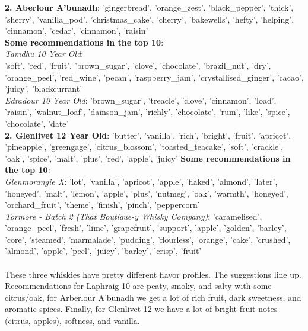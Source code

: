 \documentclass{article}
\begin{document}
\textbf{2. Aberlour A'bunadh}: 'gingerbread', 'orange\_zest', 'black\_pepper', 'thick', 'sherry', 'vanilla\_pod', 'christmas\_cake', 'cherry', 'bakewells', 'hefty', 'helping', 'cinnamon', 'cedar', 'cinnamon', 'raisin' \\
\textbf{Some recommendations in the top 10}:\\
\textit{Tamdhu 10 Year Old}:\\ 'soft', 'red', 'fruit', 'brown\_sugar', 'clove', 'chocolate', 'brazil\_nut', 'dry', 'orange\_peel', 'red\_wine', 'pecan', 'raspberry\_jam', 'crystallised\_ginger', 'cacao', 'juicy', 'blackcurrant' \\
\textit{Edradour 10 Year Old}: 'brown\_sugar', 'treacle', 'clove', 'cinnamon', 'load', 'raisin', 'walnut\_loaf', 'damson\_jam', 'richly', 'chocolate', 'rum', 'like', 'spice', 'chocolate', 'date'\\
\textbf{2. Glenlivet 12 Year Old}: 'butter', 'vanilla', 'rich', 'bright', 'fruit', 'apricot', 'pineapple', 'greengage', 'citrus\_blossom', 'toasted\_teacake', 'soft', 'crackle', 'oak', 'spice', 'malt', 'plus', 'red', 'apple', 'juicy'
\textbf{Some recommendations in the top 10}:\\
\textit{Glenmorangie X}: 'lot', 'vanilla', 'apricot', 'apple', 'flaked', 'almond', 'later', 'honeyed', 'malt', 'lemon', 'apple', 'plus', 'nutmeg', 'oak', 'warmth', 'honeyed', 'orchard\_fruit', 'theme', 'finish', 'pinch', 'peppercorn'\\
\textit{Tormore - Batch 2 (That Boutique-y Whisky Company)}: 'caramelised', 'orange\_peel', 'fresh', 'lime', 'grapefruit', 'support', 'apple', 'golden', 'barley', 'core', 'steamed', 'marmalade', 'pudding', 'flourless', 'orange', 'cake', 'crushed', 'almond', 'apple', 'peel', 'juicy', 'barley', 'crisp', 'fruit'
\paragraph{} These three whiskies have pretty different flavor profiles. The suggestions line up. Recommendations for Laphraig 10 are peaty, smoky, and salty with some citrus/oak, for Arberlour A'bunadh we get a lot of rich fruit, dark sweetness, and aromatic spices. Finally, for Glenlivet 12 we have a lot of bright fruit notes (citrus, apples), softness, and vanilla.
\end{document}
